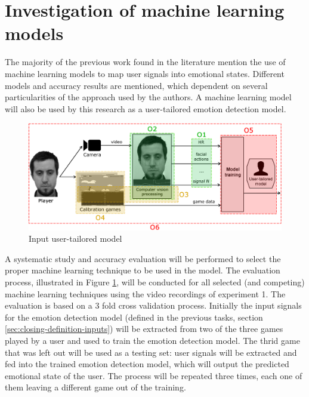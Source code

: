 \section{Investigation of machine learning models}

The majority of the previous work found in the literature mention the use of machine learning models to map user signals into emotional states. Different models and accuracy results are mentioned, which dependent on several particularities of the approach used by the authors. A machine learning model will also be used by this research as a user-tailored emotion detection model.

\begin{figure}[h]
    \centering
    \includegraphics[width=\textwidth]{figures/components-objectives.png}
    \caption{Input user-tailored model}
    \label{fig:machine-learning-investigation}
\end{figure}

A systematic study and accuracy evaluation will be performed to select the proper machine learning technique to be used in the model. The evaluation process, illustrated in Figure \ref{fig:machine-learning-investigation}, will be conducted for all selected (and competing) machine learning techniques using the video recordings of experiment 1. The evaluation is based on a 3 fold cross validation process. Initially the input signals for the emotion detection model (defined in the previous tasks, section \ref{sec:closing-definition-inputs}) will be extracted from two of the three games played by a user and used to train the emotion detection model. The thrid game that was left out will be used as a testing set: user signals will be extracted and fed into the trained emotion detection model, which will output the predicted emotional state of the user. The process will be repeated three times, each one of them leaving a different game out of the training.


